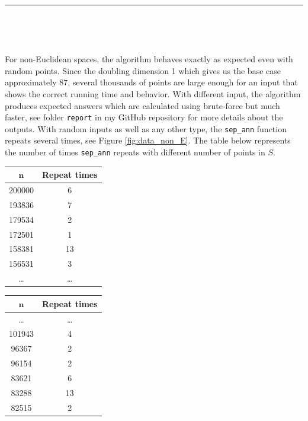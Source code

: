 \documentclass[12pt,english,]{article}
\newcommand{\code}[1]{\colorbox{light-gray}{\texttt{#1}}}
\let\origfigure\figure
\let\endorigfigure\endfigure
\renewenvironment{figure}[1][2] {
    \expandafter\origfigure\expandafter[H]
} {
    \endorigfigure
}
\begin{document}
\hrule

~

~

For non-Euclidean spaces, the algorithm behaves exactly as expected even
with random points. Since the doubling dimension 1 which gives us the
base case approximately \(87\), several thousands of points are large
enough for an input that shows the correct running time and behavior.
With different input, the algorithm produces expected answers which are
calculated using brute-force but much faster, see folder \code{report}
in my GitHub repository for more details about the outputs. With random
inputs as well as any other type, the \code{sep\_ann} function repeats
several times, see Figure \ref{fig:data_non_E}. The table below
represents the number of times \code{sep\_ann} repeats with different
number of points in \(S\).

\begin{figure}
\begin{minipage}{0.48\textwidth}
  \centering
  \begin{tabular}{|c|c|}
  \hline
  $\boldsymbol n$   & \textbf{Repeat times} \\ \hline
   200000  & 6            \\ \hline
   193836  & 7            \\ \hline
   179534  & 2            \\ \hline
   172501  & 1            \\ \hline
   158381  & 13           \\ \hline
   156531  & 3            \\ \hline
  \ldots   & \ldots       \\ \hline
  \end{tabular}
\end{minipage}
\begin{minipage}{0.48\textwidth}
  \centering
  \begin{tabular}{|c|c|}
  \hline
  $\boldsymbol n$   & \textbf{Repeat times} \\ \hline
  \ldots   & \ldots       \\ \hline
  101943   & 4            \\ \hline
   96367   & 2            \\ \hline
   96154   & 2            \\ \hline
   83621   & 6            \\ \hline
   83288   & 13           \\ \hline
   82515   & 2            \\ \hline
  \end{tabular}
\end{minipage}
\caption[Caption]{Given an input of $200\,000$ points generated in a grid. This is a portion of the data about the number of times the algorithm \textsc{SepAnn$(S,n,d,\mu,c)$} repeats.}
\label{fig:data_non_E}
\end{figure}
\end{document}
